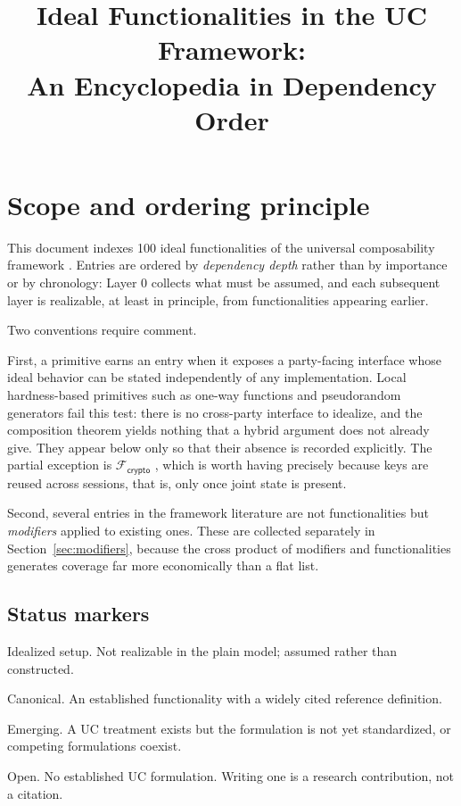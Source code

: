 \documentclass[11pt,a4paper]{article}
\title{Ideal Functionalities in the {UC} Framework:\\
       An Encyclopedia in Dependency Order}
\author{}
\date{}
\newcommand{\Func}[1]{\ensuremath{\mathcal{F}_{\mathsf{#1}}}}
\newcommand{\StS}{\ensuremath{\mathsf{S}}}   %
\newcommand{\StC}{\ensuremath{\mathsf{C}}}   %
\newcommand{\StE}{\ensuremath{\mathsf{E}}}   %
\newcommand{\StO}{\ensuremath{\mathsf{O}}}   %
\begin{document}
\maketitle

\section{Scope and ordering principle}

This document indexes 100 ideal functionalities of the universal composability
framework \cite{c01,c20}. Entries are ordered by \emph{dependency depth}
rather than by importance or by chronology: Layer 0 collects what must be
assumed, and each subsequent layer is realizable, at least in principle, from
functionalities appearing earlier.

Two conventions require comment.

First, a primitive earns an entry when it exposes a party-facing interface
whose ideal behavior can be stated independently of any implementation. Local
hardness-based primitives such as one-way functions and pseudorandom
generators fail this test: there is no cross-party interface to idealize, and
the composition theorem yields nothing that a hybrid argument does not already
give. They appear below only so that their absence is recorded explicitly. The
partial exception is \Func{crypto} \cite{kt11,bpw03}, which is worth having
precisely because keys are reused across sessions, that is, only once joint
state is present.

Second, several entries in the framework literature are not functionalities
but \emph{modifiers} applied to existing ones. These are collected separately
in Section~\ref{sec:modifiers}, because the cross product of modifiers and
functionalities generates coverage far more economically than a flat list.

\subsection*{Status markers}

\begin{description}[leftmargin=2.4em,style=nextline,itemsep=0.15em]
  \item[\StS] Idealized setup. Not realizable in the plain model; assumed
    rather than constructed.
  \item[\StC] Canonical. An established functionality with a widely cited
    reference definition.
  \item[\StE] Emerging. A UC treatment exists but the formulation is not yet
    standardized, or competing formulations coexist.
  \item[\StO] Open. No established UC formulation. Writing one is a research
    contribution, not a citation.
\end{description}
\end{document}
